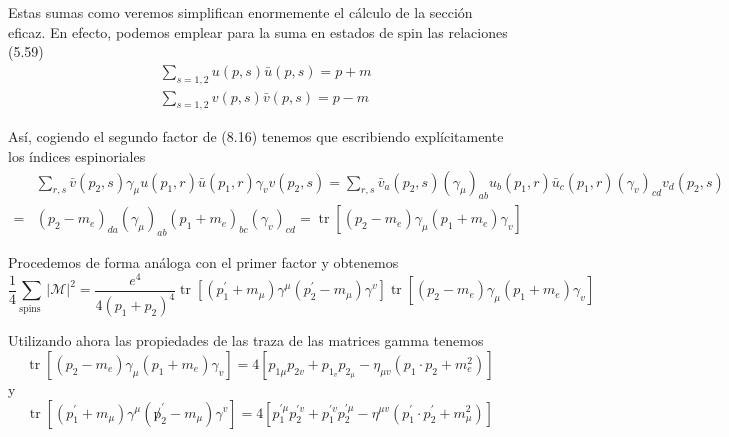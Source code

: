 Estas sumas como veremos simplifican enormemente el cálculo de la sección eficaz. En efecto, podemos emplear para la suma en estados de spin las relaciones (5.59)
$$
\begin{align*}
& \sum_{s=1,2} u(p, s) \bar{u}(p, s)=p+m  \tag{8.18}\\
& \sum_{s=1,2} v(p, s) \bar{v}(p, s)=p-m \tag{8.19}
\end{align*}
$$

Así, cogiendo el segundo factor de (8.16) tenemos que escribiendo explícitamente los índices espinoriales
$$
\begin{align*}
& \sum_{r, s} \bar{v}\left(p_{2}, s\right) \gamma_{\mu} u\left(p_{1}, r\right) \bar{u}\left(p_{1}, r\right) \gamma_{v} v\left(p_{2}, s\right)=\sum_{r, s} \bar{v}_{a}\left(p_{2}, s\right)\left(\gamma_{\mu}\right)_{a b} u_{b}\left(p_{1}, r\right) \bar{u}_{c}\left(p_{1}, r\right)\left(\gamma_{v}\right)_{c d} v_{d}\left(p_{2}, s\right) \\
= & \left(p_{2}-m_{e}\right)_{d a}\left(\gamma_{\mu}\right)_{a b}\left(p_{1}+m_{e}\right)_{b c}\left(\gamma_{v}\right)_{c d}=\operatorname{tr}\left[\left(p_{2}-m_{e}\right) \gamma_{\mu}\left(p_{1}+m_{e}\right) \gamma_{v}\right] \tag{8.20}
\end{align*}
$$

Procedemos de forma análoga con el primer factor y obtenemos
\begin{equation*}
\frac{1}{4} \sum_{\text {spins }}|\mathscr{M}|^{2}=\frac{e^{4}}{4\left(p_{1}+p_{2}\right)^{4}} \operatorname{tr}\left[\left(p_{1}^{\prime}+m_{\mu}\right) \gamma^{\mu}\left(p_{2}^{\prime}-m_{\mu}\right) \gamma^{v}\right] \operatorname{tr}\left[\left(p_{2}-m_{e}\right) \gamma_{\mu}\left(p_{1}+m_{e}\right) \gamma_{v}\right] \tag{8.21}
\end{equation*}

Utilizando ahora las propiedades de las traza de las matrices gamma tenemos
\begin{equation*}
\operatorname{tr}\left[\left(p_{2}-m_{e}\right) \gamma_{\mu}\left(p_{1}+m_{e}\right) \gamma_{v}\right]=4\left[p_{1 \mu} p_{2 v}+p_{1_{v}} p_{2_{\mu}}-\eta_{\mu v}\left(p_{1} \cdot p_{2}+m_{e}^{2}\right)\right] \tag{8.22}
\end{equation*}
y
\begin{equation*}
\operatorname{tr}\left[\left(p_{1}^{\prime}+m_{\mu}\right) \gamma^{\mu}\left(\not p_{2}^{\prime}-m_{\mu}\right) \gamma^{v}\right]=4\left[p_{1}^{\prime \mu} p_{2}^{\prime v}+p_{1}^{\prime v} p_{2}^{\prime \mu}-\eta^{\mu v}\left(p_{1}^{\prime} \cdot p_{2}^{\prime}+m_{\mu}^{2}\right)\right] \tag{8.23}
\end{equation*}


